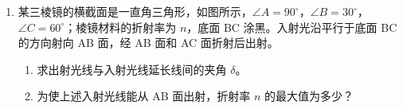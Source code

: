 \documentclass[\gkver]{gaokaozhenti}
\begin{document}
\begin{enumerate}
（a）将设计的电路图画在下方虚线框内。

（b）灯两端电压可调节的范围为 。

（c）按设计的电路图，将如图所示仪器用线（表示导线）连接起来。
\onepicture[align=right, w=7cm]{}

\item
某三棱镜的横截面是一直角三角形，如图所示，$\angle A = 90^{\circ}$，$\angle B = 30^{\circ}$，$\angle C = 60^{\circ}$；棱镜材料的折射率为 $n$，底面 BC 涂黑。入射光沿平行于底面 BC 的方向射向 AB 面，经 AB 面和 AC 面折射后出射。
\begin{enumerate}
	\item
	求出射光线与入射光线延长线间的夹角 $\delta$。
	\item
	为使上述入射光线能从 AB 面出射，折射率 $n$ 的最大值为多少？
\end{enumerate}
\onepicture[align=right, w=9cm]{}
\end{enumerate}
\end{document}
